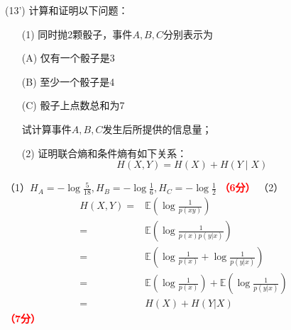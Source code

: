 \documentclass[12pt,a4paper,openany,twoside]{ctexbook}
\begin{document}
\begin{exercise}(13')
	计算和证明以下问题：
	\begin{itemize}
		\item [(1)] 同时抛2颗骰子，事件$A,B,C$分别表示为
		
		(A) 仅有一个骰子是3
		
		(B) 至少一个骰子是4
		
		(C) 骰子上点数总和为7
		
		试计算事件$A,B,C$发生后所提供的信息量；
		
		\item [(2)] 证明联合熵和条件熵有如下关系：
		$$H(X,Y) = H(X) + H(Y\mid X)$$
		
	\end{itemize}
\end{exercise}
\begin{Solution}
	（1）$H_A=-\log \frac{5}{18},H_B=-\log \frac{1}{6},H_C=-\log \frac{1}{2}$ \hfill \textcolor{red}{\textbf{（6分）}}
	（2）\begin{align*}
		H(X,Y)=&\mathbb{E}(\log\frac{1}{p(xy)})\\
		=&\mathbb{E}(\log\frac{1}{p(x)p(y|x)})\\
		=&\mathbb{E}(\log\frac{1}{p(x)}+\log\frac{1}{p(y|x)})\\
		=&\mathbb{E}(\log\frac{1}{p(x)})+\mathbb{E}(\log\frac{1}{p(y|x)})\\
		=&H(X)+H(Y|X)
	\end{align*}\hfill \textcolor{red}{\textbf{（7分）}}
\end{Solution}
\end{document}
